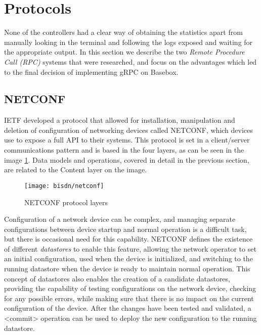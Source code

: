 \section{Protocols}

None of the controllers had a clear way of obtaining the statistics apart from manually looking in the terminal and following the logs exposed and waiting for the
appropriate output. In this section we describe the two \textit {Remote Procedure Call (RPC)} systems that were researched, and focus on the advantages which led 
to the final decision of implementing gRPC on Basebox.

\subsection{NETCONF} \label{sec:netconf}

\par IETF developed a protocol that allowed for installation, manipulation and deletion of configuration of networking devices called NETCONF, which
devices use to expose a full API to their systems. This protocol is set in a client/server communications pattern and is based in the four layers, as can be seen in
the image \ref{fig:netconf_proto_layers}. Data models and operations, covered in detail in the previous section, are related to the Content layer on the image.

\begin{figure} [!htbp]
    \centering
    \texttt{[image: bisdn/netconf]}
    \caption{NETCONF protocol layers \cite{enns_network_2011}}
    \label{fig:netconf_proto_layers}
\end{figure}

\par Configuration of a network device can be complex, and managing separate configurations between device startup and normal operation is a difficult task, but
there is occasional need for this capability. NETCONF defines the existence of different \textit{datastores} to enable this feature, allowing the network operator to
set an initial configuration, used when the device is initialized, and switching to the running datastore when the device is ready to maintain normal operation. This
concept of datastores also enables the creation of a candidate datastores, providing the capability of testing configurations on the network device, checking for any
possible errors, while making sure that there is no impact on the current configuration of the device. After the changes have been tested and validated, a <commit>
operation can be used to deploy the new configuration to the running datastore.

